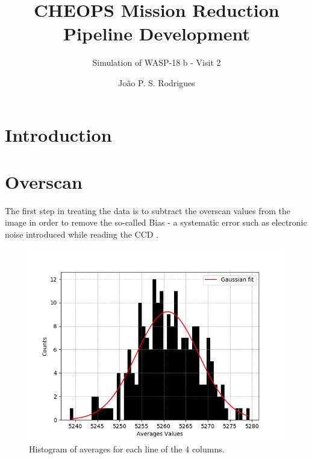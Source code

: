 \documentclass{aa}
\begin{document}
 


   \title{CHEOPS Mission Reduction Pipeline Development}

   \subtitle{Simulation of WASP-18 b - Visit 2}

   \author{João P. S. Rodrigues}


   \date{}

 
  \abstract
   {}
   {}
   {}
   {}
   {}

   \keywords{}

   \maketitle
%

\section{Introduction}

\section{Overscan}

The first step in treating the data is to subtract the overscan values from the image in order to remove the so-called Bias - a systematic error such as electronic noise introduced while reading the CCD .

\begin{figure}[H]
\centering
\includegraphics[width=.4\textwidth]{overscan_hist.png}
\caption{Histogram of averages for each line of the 4 columns.}
\label{fig:overscan_hist}
\end{figure}
\end{document}
